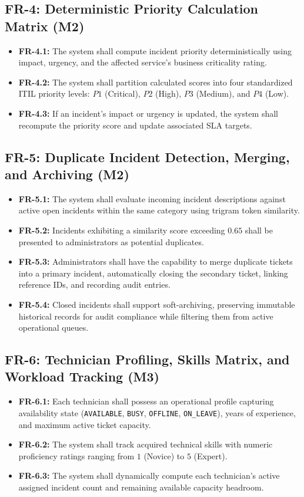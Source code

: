 \documentclass[11pt,a4paper,oneside]{report}
\begin{document}
\subsection{FR-4: Deterministic Priority Calculation Matrix (M2)}
\begin{itemize}
    \item \textbf{FR-4.1:} The system shall compute incident priority deterministically using impact, urgency, and the affected service's business criticality rating.
    \item \textbf{FR-4.2:} The system shall partition calculated scores into four standardized ITIL priority levels: $P1$ (Critical), $P2$ (High), $P3$ (Medium), and $P4$ (Low).
    \item \textbf{FR-4.3:} If an incident's impact or urgency is updated, the system shall recompute the priority score and update associated SLA targets.
\end{itemize}

\subsection{FR-5: Duplicate Incident Detection, Merging, and Archiving (M2)}
\begin{itemize}
    \item \textbf{FR-5.1:} The system shall evaluate incoming incident descriptions against active open incidents within the same category using trigram token similarity.
    \item \textbf{FR-5.2:} Incidents exhibiting a similarity score exceeding $0.65$ shall be presented to administrators as potential duplicates.
    \item \textbf{FR-5.3:} Administrators shall have the capability to merge duplicate tickets into a primary incident, automatically closing the secondary ticket, linking reference IDs, and recording audit entries.
    \item \textbf{FR-5.4:} Closed incidents shall support soft-archiving, preserving immutable historical records for audit compliance while filtering them from active operational queues.
\end{itemize}

\subsection{FR-6: Technician Profiling, Skills Matrix, and Workload Tracking (M3)}
\begin{itemize}
    \item \textbf{FR-6.1:} Each technician shall possess an operational profile capturing availability state (\texttt{AVAILABLE}, \texttt{BUSY}, \texttt{OFFLINE}, \texttt{ON\_LEAVE}), years of experience, and maximum active ticket capacity.
    \item \textbf{FR-6.2:} The system shall track acquired technical skills with numeric proficiency ratings ranging from $1$ (Novice) to $5$ (Expert).
    \item \textbf{FR-6.3:} The system shall dynamically compute each technician's active assigned incident count and remaining available capacity headroom.
\end{itemize}
\end{document}
